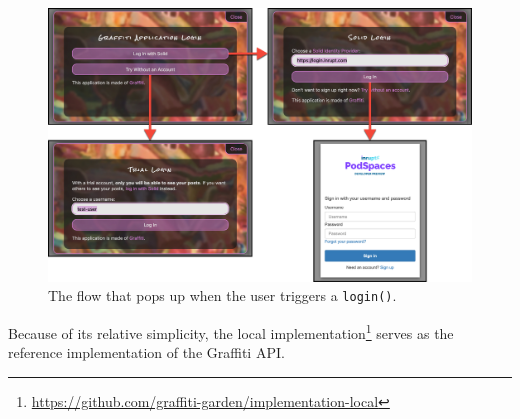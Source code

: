 \begin{figure}[ht]
    \includegraphics[width=\textwidth]{figures/login.jpg}
    \caption{The flow that pops up when the user triggers a \texttt{login()}.}
    \label{above-and-below:figure:login}
\end{figure}

Because of its relative simplicity, the local implementation\footnote{
    \url{https://github.com/graffiti-garden/implementation-local}
} serves as the reference implementation of the Graffiti API.







